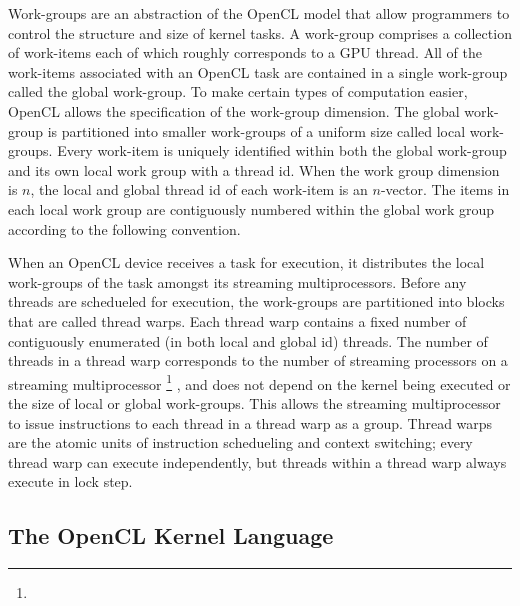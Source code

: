 \documentclass[12pt,twoside]{reedthesis}
\begin{document}
Work-groups are an abstraction of the OpenCL model that allow programmers to control the structure and size of kernel tasks. A work-group comprises a collection of work-items each of which roughly corresponds to a GPU thread. All of the work-items associated with an OpenCL task are contained in a single work-group called the global work-group. To make certain types of computation easier, OpenCL allows the specification of the work-group dimension. The global work-group is partitioned into smaller work-groups of a uniform size called local work-groups. Every work-item is uniquely identified within both the global work-group and its own local work group with a thread id. When the work group dimension is $n$, the local and global thread id of each work-item is an $n$-vector. The items in each local work group are contiguously numbered within the global work group according to the following convention.

When an OpenCL device receives a task for execution, it distributes the local work-groups of the task amongst its streaming multiprocessors. Before any threads are schedueled for execution, the work-groups are partitioned into blocks that are called thread warps. Each thread warp contains a fixed number of contiguously enumerated (in both local and global id) threads. The number of threads in a thread warp corresponds to the number of streaming processors on a streaming multiprocessor
\footnote{}
, and does not depend on the kernel being executed or the size of local or global work-groups. This allows the streaming multiprocessor to issue instructions to each thread in a thread warp as a group. Thread warps are the atomic units of instruction schedueling and context switching; every thread warp can execute independently, but threads within a thread warp always execute in lock step.

\subsection{The OpenCL Kernel Language}
\end{document}
